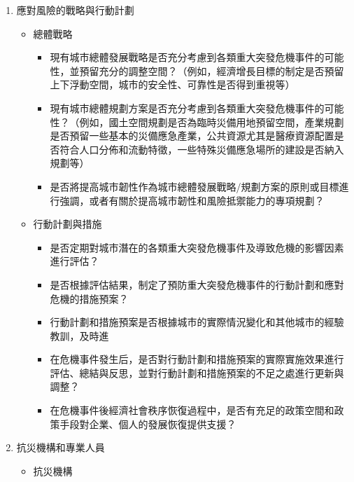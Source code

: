 \documentclass[a4paper,12pt]{article}
\begin{document}
\begin{enumerate}
\begin{enumerate}
\begin{enumerate}
\begin{itemize}
\begin{itemize}
\end{itemize}
\end{itemize}
\item 應對風險的戰略與行動計劃
\label{sec:orga823248}
\begin{itemize}
\item 總體戰略
\label{sec:org87f0f5c}
\begin{itemize}
\item 現有城市總體發展戰略是否充分考慮到各類重大突發危機事件的可能性，並預留充分的調整空間？（例如，經濟增長目標的制定是否預留上下浮動空間，城市的安全性、可靠性是否得到重視等）\\
\item 現有城市總體規劃方案是否充分考慮到各類重大突發危機事件的可能性？（例如，國土空間規劃是否為臨時災備用地預留空間，產業規劃是否預留一些基本的災備應急產業，公共資源尤其是醫療資源配置是否符合人口分佈和流動特徵，一些特殊災備應急場所的建設是否納入規劃等）\\
\item 是否將提高城市韌性作為城市總體發展戰略/規劃方案的原則或目標進行強調，或者有關於提高城市韌性和風險抵禦能力的專項規劃？\\
\end{itemize}
\item 行動計劃與措施
\label{sec:orgb5da402}
\begin{itemize}
\item 是否定期對城市潛在的各類重大突發危機事件及導致危機的影響因素進行評估？\\
\item 是否根據評估結果，制定了預防重大突發危機事件的行動計劃和應對危機的措施預案？\\
\item 行動計劃和措施預案是否根據城市的實際情況變化和其他城市的經驗教訓，及時進\\
\item 在危機事件發生后，是否對行動計劃和措施預案的實際實施效果進行評估、總結與反思，並對行動計劃和措施預案的不足之處進行更新與調整？\\
\item 在危機事件後經濟社會秩序恢復過程中，是否有充足的政策空間和政策手段對企業、個人的發展恢復提供支援？\\
\end{itemize}
\end{itemize}
\item 抗災機構和專業人員
\label{sec:org6a680f5}
\begin{itemize}
\item 抗災機構
\label{sec:org90e72a7}

\end{itemize}
\end{enumerate}
\end{enumerate}
\end{enumerate}
\end{document}
